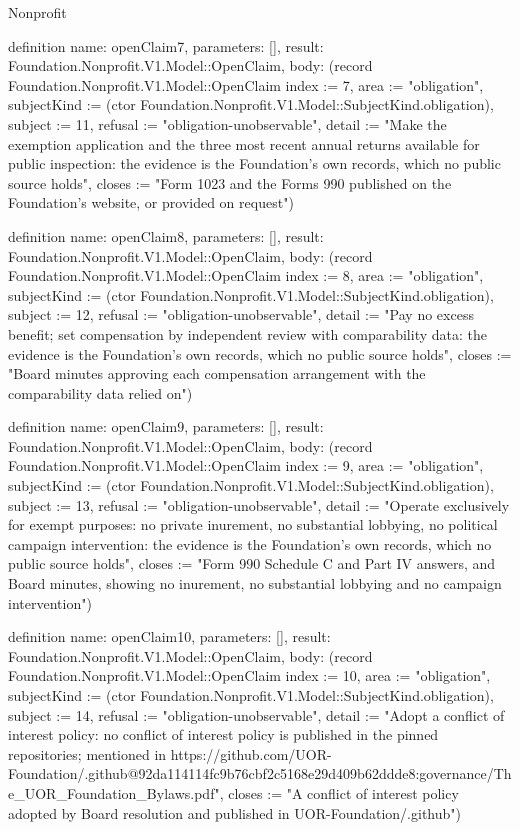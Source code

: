 \begin{lexlean}{Nonprofit}
\begin{semanticmodule}
definition{
  name: openClaim7,
  parameters: [],
  result: Foundation.Nonprofit.V1.Model::OpenClaim,
  body: (record Foundation.Nonprofit.V1.Model::OpenClaim {index := 7, area := "obligation", subjectKind := (ctor Foundation.Nonprofit.V1.Model::SubjectKind.obligation), subject := 11, refusal := "obligation-unobservable", detail := "Make the exemption application and the three most recent annual returns available for public inspection: the evidence is the Foundation’s own records, which no public source holds", closes := "Form 1023 and the Forms 990 published on the Foundation's website, or provided on request"})
}

definition{
  name: openClaim8,
  parameters: [],
  result: Foundation.Nonprofit.V1.Model::OpenClaim,
  body: (record Foundation.Nonprofit.V1.Model::OpenClaim {index := 8, area := "obligation", subjectKind := (ctor Foundation.Nonprofit.V1.Model::SubjectKind.obligation), subject := 12, refusal := "obligation-unobservable", detail := "Pay no excess benefit; set compensation by independent review with comparability data: the evidence is the Foundation’s own records, which no public source holds", closes := "Board minutes approving each compensation arrangement with the comparability data relied on"})
}

definition{
  name: openClaim9,
  parameters: [],
  result: Foundation.Nonprofit.V1.Model::OpenClaim,
  body: (record Foundation.Nonprofit.V1.Model::OpenClaim {index := 9, area := "obligation", subjectKind := (ctor Foundation.Nonprofit.V1.Model::SubjectKind.obligation), subject := 13, refusal := "obligation-unobservable", detail := "Operate exclusively for exempt purposes: no private inurement, no substantial lobbying, no political campaign intervention: the evidence is the Foundation’s own records, which no public source holds", closes := "Form 990 Schedule C and Part IV answers, and Board minutes, showing no inurement, no substantial lobbying and no campaign intervention"})
}

definition{
  name: openClaim10,
  parameters: [],
  result: Foundation.Nonprofit.V1.Model::OpenClaim,
  body: (record Foundation.Nonprofit.V1.Model::OpenClaim {index := 10, area := "obligation", subjectKind := (ctor Foundation.Nonprofit.V1.Model::SubjectKind.obligation), subject := 14, refusal := "obligation-unobservable", detail := "Adopt a conflict of interest policy: no conflict of interest policy is published in the pinned repositories; mentioned in https://github.com/UOR-Foundation/.github@92da114114fc9b76cbf2c5168e29d409b62ddde8:governance/The_UOR_Foundation_Bylaws.pdf", closes := "A conflict of interest policy adopted by Board resolution and published in UOR-Foundation/.github"})
}


\end{semanticmodule}
\end{lexlean}
